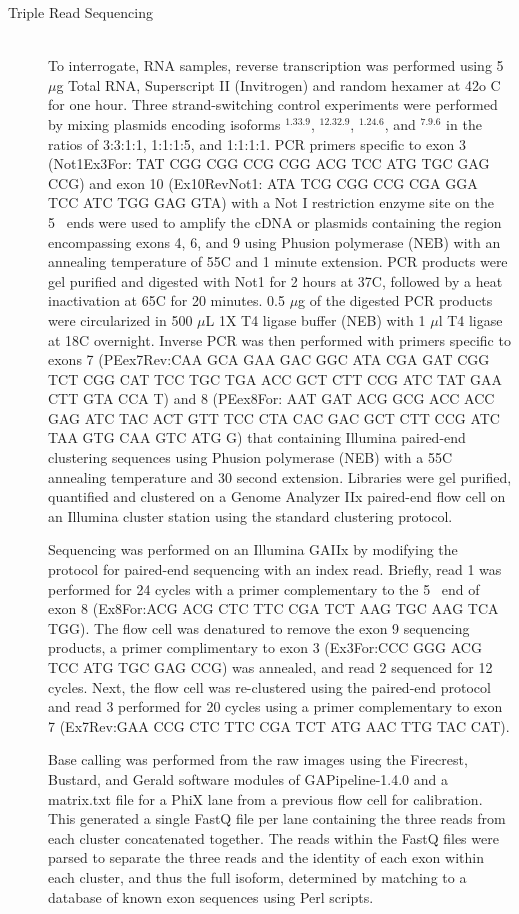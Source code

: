 \begin{description}
		\item[Triple Read Sequencing] \hfill \\
		To interrogate, RNA samples, reverse transcription was performed using 5 $\mu$g Total RNA, Superscript II (Invitrogen) and random hexamer at 42o C for one hour. Three strand-switching control experiments were performed by mixing plasmids encoding isoforms \dscam{}$^{1.33.9}$, \dscam{}$^{12.32.9}$, \dscam{}$^{1.24.6}$, and \dscam{}$^{7.9.6}$ in the ratios of 3:3:1:1, 1:1:1:5, and 1:1:1:1. PCR primers specific to exon 3 (Not1Ex3For: TAT CGG CGG CCG CGG ACG TCC ATG TGC GAG CCG) and exon 10 (Ex10RevNot1: ATA TCG CGG CCG CGA GGA TCC ATC TGG GAG GTA) with a Not I restriction enzyme site on the 5\textprime~ ends were used to amplify the cDNA or plasmids containing the region encompassing exons 4, 6, and 9 using Phusion polymerase (NEB) with an annealing temperature of 55\degree C and 1 minute extension. PCR products were gel purified and digested with Not1 for 2 hours at 37\degree C, followed by a heat inactivation at 65\degree C for 20 minutes. 0.5 $\mu$g of the digested PCR products were circularized in 500 $\mu$L 1X T4 ligase buffer (NEB) with 1 $\mu$l T4 ligase at 18\degree C overnight. Inverse PCR was then performed with primers specific to exons 7 (PEex7Rev:CAA GCA GAA GAC GGC ATA CGA GAT CGG TCT CGG CAT TCC TGC TGA ACC GCT CTT CCG ATC TAT GAA CTT GTA CCA T) and 8 (PEex8For: AAT GAT ACG GCG ACC ACC GAG ATC TAC ACT GTT TCC CTA CAC GAC GCT CTT CCG ATC TAA GTG CAA GTC ATG G) that containing Illumina paired-end clustering sequences using Phusion polymerase (NEB) with a 55\degree C annealing temperature and 30 second extension. Libraries were gel purified, quantified and clustered on a Genome Analyzer IIx paired-end flow cell on an Illumina cluster station using the standard clustering protocol.

		Sequencing was performed on an Illumina GAIIx by modifying the protocol for paired-end sequencing with an index read. Briefly, read 1 was performed for 24 cycles with a primer complementary to the 5\textprime~ end of exon 8 (Ex8For:ACG ACG CTC TTC CGA TCT AAG TGC AAG TCA TGG). The flow cell was denatured to remove the exon 9 sequencing products, a primer complimentary to exon 3 (Ex3For:CCC GGG ACG TCC ATG TGC GAG CCG) was annealed, and read 2 sequenced for 12 cycles. Next, the flow cell was re-clustered using the paired-end protocol and read 3 performed for 20 cycles using a primer complementary to exon 7 (Ex7Rev:GAA CCG CTC TTC CGA TCT ATG AAC TTG TAC CAT).

		Base calling was performed from the raw images using the Firecrest, Bustard, and Gerald software modules of GAPipeline-1.4.0 and a matrix.txt file for a PhiX lane from a previous flow cell for calibration. This generated a single FastQ file per lane containing the three reads from each cluster concatenated together. The reads within the FastQ files were parsed to separate the three reads and the identity of each exon within each cluster, and thus the full isoform, determined by matching to a database of known exon sequences using Perl scripts.
		

\end{description}
